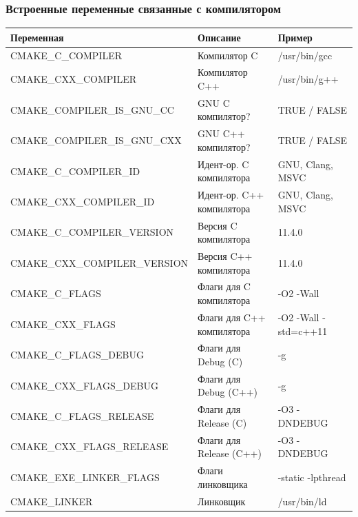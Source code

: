 \documentclass[10pt, aspectratio=1610]{beamer}
\begin{document}
\begin{frame}[fragile]\frametitle{Встроенные переменные связанные с компилятором}
	\small
	\begin{tabular}{>{\ttfamily}l l l}
		\hline
		\textbf{Переменная} & \textbf{Описание} & \textbf{Пример} \\
		\hline
		CMAKE\_C\_COMPILER & Компилятор C & /usr/bin/gcc \\
		CMAKE\_CXX\_COMPILER & Компилятор C++ & /usr/bin/g++ \\
		CMAKE\_COMPILER\_IS\_GNU\_CC & GNU C компилятор? & TRUE / FALSE \\
		CMAKE\_COMPILER\_IS\_GNU\_CXX & GNU C++ компилятор? & TRUE / FALSE \\
		CMAKE\_C\_COMPILER\_ID & Идент-ор. C компилятора & GNU, Clang, MSVC \\
		CMAKE\_CXX\_COMPILER\_ID & Идент-ор. C++ компилятора & GNU, Clang, MSVC \\
		CMAKE\_C\_COMPILER\_VERSION & Версия C компилятора & 11.4.0 \\
		CMAKE\_CXX\_COMPILER\_VERSION & Версия C++ компилятора & 11.4.0 \\
		CMAKE\_C\_FLAGS & Флаги для C компилятора & -O2 -Wall \\
		CMAKE\_CXX\_FLAGS & Флаги для C++ компилятора & -O2 -Wall -std=c++11 \\
		CMAKE\_C\_FLAGS\_DEBUG & Флаги для Debug (C) & -g \\
		CMAKE\_CXX\_FLAGS\_DEBUG & Флаги для Debug (C++) & -g \\
		CMAKE\_C\_FLAGS\_RELEASE & Флаги для Release (C) & -O3 -DNDEBUG \\
		CMAKE\_CXX\_FLAGS\_RELEASE & Флаги для Release (C++) & -O3 -DNDEBUG \\
		CMAKE\_EXE\_LINKER\_FLAGS & Флаги линковщика & -static -lpthread \\
		CMAKE\_LINKER & Линковщик & /usr/bin/ld \\
		\hline
	\end{tabular}
	
	
\end{frame}
\end{document}
